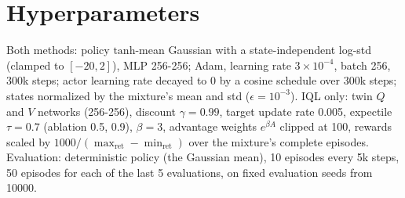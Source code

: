\documentclass{article}
\begin{document}
\appendix
\section{Hyperparameters}\label{app:hparams}
Both methods: policy $\mathrm{tanh}$-mean Gaussian with a state-independent log-std (clamped to $[-20, 2]$), MLP 256-256; Adam, learning rate $3\times10^{-4}$, batch 256, 300k steps; actor learning rate decayed to 0 by a cosine schedule over 300k steps; states normalized by the mixture's mean and std ($\epsilon=10^{-3}$). IQL only: twin $Q$ and $V$ networks (256-256), discount $\gamma=0.99$, target update rate 0.005, expectile $\tau=0.7$ (ablation 0.5, 0.9), $\beta=3$, advantage weights $e^{\beta A}$ clipped at 100, rewards scaled by $1000/(\max_\text{ret}-\min_\text{ret})$ over the mixture's complete episodes. Evaluation: deterministic policy (the Gaussian mean), 10 episodes every 5k steps, 50 episodes for each of the last 5 evaluations, on fixed evaluation seeds from 10000.
\end{document}
